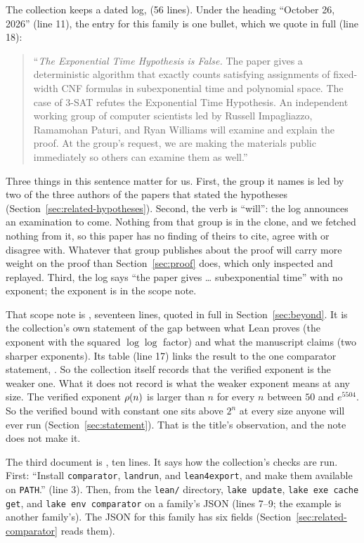 The collection keeps a dated log,  (56 lines). Under
the heading ``October 26, 2026'' (line 11), the entry for this family is
one bullet, which we quote in full (line 18):
\begin{quote}\small
``\emph{The Exponential Time Hypothesis is False.} The paper gives a
deterministic algorithm that exactly counts satisfying assignments of
fixed-width CNF formulas in subexponential time and polynomial space. The
case of 3-SAT refutes the Exponential Time Hypothesis. An independent
working group of computer scientists led by Russell Impagliazzo,
Ramamohan Paturi, and Ryan Williams will examine and explain the proof.
At the group’s request, we are making the materials public immediately so
others can examine them as well.''
\end{quote}
Three things in this sentence matter for us. First, the group it names is
led by two of the three authors of the papers that stated the hypotheses
(Section~\ref{sec:related-hypotheses}). Second, the verb is ``will'': the
log announces an examination to come. Nothing from that group is in the
clone, and we fetched nothing from it, so this paper has no finding of
theirs to cite, agree with or disagree with. Whatever that group
publishes about the proof will carry more weight on the proof than
Section~\ref{sec:proof} does, which only inspected and replayed. Third,
the log says ``the paper gives \ldots{} subexponential time'' with no
exponent; the exponent is in the scope note.

That scope note is , seventeen lines, quoted
in full in Section~\ref{sec:beyond}. It is the collection's own statement
of the gap between what Lean proves (the exponent with the squared
$\log\log$ factor) and what the manuscript claims (two sharper
exponents). Its table (line 17) links the result to the one comparator
statement, .
So the collection itself records that the verified exponent is the weaker
one. What it does not record is what the weaker exponent means at any
size. The verified exponent $\rho(n)$ is larger than $n$ for every
$n$ between $50$ and $e^{5504}$. So the verified bound with constant
one sits above $2^n$ at every size anyone will ever run
(Section~\ref{sec:statement}). That is the title's observation, and the
note does not make it.

The third document is ,
ten lines. It says how the collection's checks are run. First: ``Install
\texttt{comparator}, \texttt{landrun}, and \texttt{lean4export}, and make
them available on \texttt{PATH}.'' (line 3). Then, from the \texttt{lean/}
directory, \texttt{lake update}, \texttt{lake exe cache get}, and
\texttt{lake env comparator} on a family's JSON (lines 7--9; the example
is another family's). The JSON for this family has six fields
(Section~\ref{sec:related-comparator} reads them).

